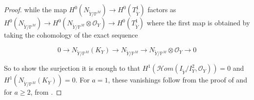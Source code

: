 \documentclass[11pt,twoside]{amsart}
\theoremstyle{plain}
\numberwithin{equation}{section}
\newtheorem{lemma}[theorem]{Lemma}
\theoremstyle{definition}
\begin{document}
\begin{proof}
while the map $H^0(N_{\widetilde{Y}/\mathbb{P}^M}) \to H^0(T_{\widetilde{Y}}^1)$ factors as $H^0(N_{\widetilde{Y}/\mathbb{P}^M}) \to H^0(N_{\widetilde{Y}/\mathbb{P}^M} \otimes \mathcal{O}_Y) \to H^0(T_{\widetilde{Y}}^1)$ where the first map is obtained by taking the cohomology of the exact sequence

\begin{equation*}
 0 \to N_{\widetilde{Y}/\mathbb{P}^M} (K_Y) \to N_{\widetilde{Y}/\mathbb{P}^M} \to N_{\widetilde{Y}/\mathbb{P}^M} \otimes \mathcal{O}_Y \to 0   
\end{equation*}

So to show the surjection it is enough to that $H^1(\mathcal{H}om(I_{\widetilde{Y}}/I_{Y}^2, \mathcal{O}_Y)) = 0$ and $H^1(N_{\widetilde{Y}/\mathbb{P}^M} (K_Y)) = 0$. For $a = 1$, these vanishings follow from the proof of \cite[Theorem $4.1$]{GP97} and for $a \geq 2$, from \cite[Theorem $5.1$]{BMR21}.





\end{proof}
\end{document}
